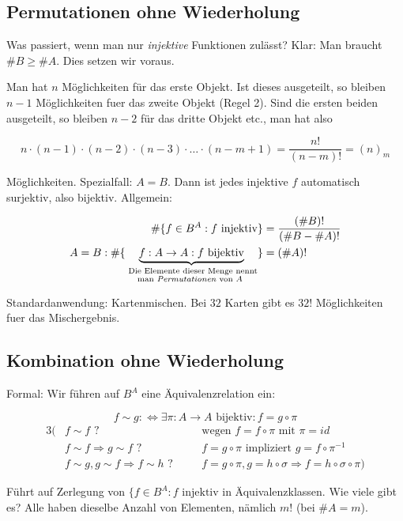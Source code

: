 \subsection{Permutationen ohne Wiederholung}

Was passiert, wenn man nur \emph{injektive} Funktionen zulässt? Klar: Man
braucht $\#B \geq \#A$. Dies setzen wir voraus.

Man hat $n$ Möglichkeiten für das erste Objekt. Ist dieses ausgeteilt, so
bleiben $n-1$ Möglichkeiten fuer das zweite Objekt (Regel 2). Sind die ersten
beiden ausgeteilt, so bleiben $n-2$ für das dritte Objekt etc., man hat also

\[ n \cdot (n-1) \cdot (n-2) \cdot (n-3) \cdot \ldots \cdot (n-m+1) =
\frac{n!}{(n-m)!} = (n)_m \]

Möglichkeiten.
Spezialfall: $A=B$. Dann ist jedes injektive $f$ automatisch surjektiv, also
bijektiv. Allgemein:

\begin{align*}
\#\{ f \in B^A : f \text{ injektiv} \} &= \frac{(\#B)!}{(\#B - \#A)!} \\
A=B : \#\{ \underbrace{f: A \to A : f \text { bijektiv}}_{ \substack{\text {
\scriptsize Die Elemente dieser Menge nennt}\\ \text{\scriptsize man \emph
{Permutationen} von $A$ }}} \} &= (\#A)!
\end{align*}

Standardanwendung: Kartenmischen. Bei $32$ Karten gibt es $32!$ Möglichkeiten
fuer das Mischergebnis.


\subsection{Kombination ohne Wiederholung}

Formal: Wir führen auf $B^A$ eine Äquivalenzrelation ein:

\[ f \sim g :\Leftrightarrow \exists \pi: A \to A \text{ bijektiv}: f = g \circ
\pi \]
\begin{alignat*}{3}
(&f \sim f  \text{ ?}&\quad
&\text{wegen } f = f \circ \pi \text{ mit } \pi = id \\
&f \sim f \Rightarrow g \sim f \text{ ? }&
&f = g \circ \pi \text{ impliziert } g = f \circ \pi^{-1} \\
&f \sim g, g \sim f \Rightarrow f \sim h \text{ ?}&
&f = g \circ \pi, g = h \circ \sigma \Rightarrow f = h \circ \sigma \circ \pi)
\end{alignat*}

Führt auf Zerlegung von $\{ f \in B^A : f \text{ injektiv}$ in
Äquivalenzklassen. Wie viele gibt es? Alle haben dieselbe Anzahl von
Elementen, nämlich $m!$ (bei $\#A = m$).


